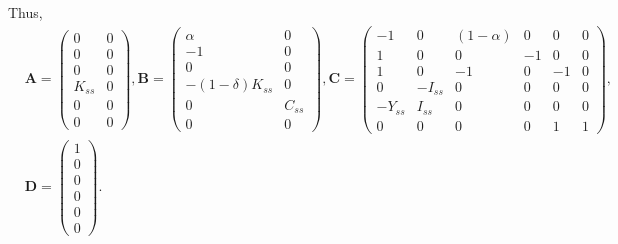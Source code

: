 \documentclass[11pt]{article}
\numberwithin{equation}{section} %
\numberwithin{figure}{section} %
\numberwithin{table}{section} %
\theoremstyle{definition}
\begin{document}
Thus,
\begin{align*}
    &\mathbf{A} = \begin{pmatrix}
        0 & 0 \\
        0 & 0 \\
        0 & 0 \\
        K_{ss} & 0 \\
        0 & 0 \\
        0 & 0
    \end{pmatrix}, \mathbf{B} = \begin{pmatrix}
        \alpha & 0 \\
        -1 & 0 \\
        0 & 0 \\
        -(1-\delta) K_{ss} & 0 \\
        0 & C_{ss} \\
        0 & 0
    \end{pmatrix}, \mathbf{C} = \begin{pmatrix}
        -1 & 0 & (1-\alpha) & 0 & 0 & 0 \\
        1 & 0 & 0 & -1 & 0 & 0 \\
        1 & 0 & -1 & 0 & -1 & 0 \\
        0 & -I_{ss} & 0 & 0 & 0 & 0 \\
        -Y_{ss} & I_{ss} & 0 & 0 & 0 & 0 \\
        0 & 0 & 0 & 0 & 1 & 1
    \end{pmatrix}, \\
    &\mathbf{D} = \begin{pmatrix}
        1 \\ 0 \\ 0 \\ 0 \\ 0 \\ 0
   \end{pmatrix}.
\end{align*}
\end{document}
